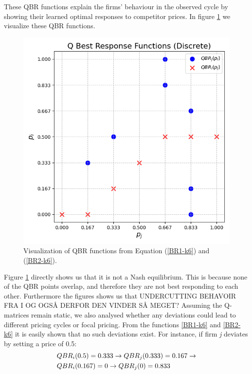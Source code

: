 \documentclass{article}
\begin{document}
These QBR functions explain the firms’ behaviour in the observed cycle by showing their learned optimal responses to competitor prices. 
\newline
In figure \ref{fig:QBR} we visualize these QBR functions.
\begin{figure}[H]
    \centering
    \includegraphics[scale = 0.5]{QBRgraph.png}
    \caption{Visualization of QBR functions from Equation (\ref{BR1-k6}) and (\ref{BR2-k6}).}
    \label{fig:QBR}
\end{figure}
Figure \ref{fig:QBR} directly shows us that it is not a Nash equilibrium. This is because none of the QBR points overlap, and therefore they are not best responding to each other. Furthermore the figures shows us that UNDERCUTTING BEHAVOIR FRA I OG OGSÅ DERFOR DEN VINDER SÅ MEGET?
\newline
Assuming the Q-matrices remain static, we also analysed whether any deviations could lead to different pricing cycles or focal pricing. From the functions \ref{BR1-k6} and \ref{BR2-k6} it is easily shown that no such deviations exist. For instance, if firm \textit{j} deviates by setting a price of 0.5:
\begin{align}
\label{CycleDeviationAndBackAgain}
    &QBR_i(0.5) = 0.333 \rightarrow QBR_j(0.333)=0.167 \rightarrow \\ &QBR_i(0.167) = 0 \rightarrow QBR_j(0) = 0.833\notag
\end{align}
\end{document}
